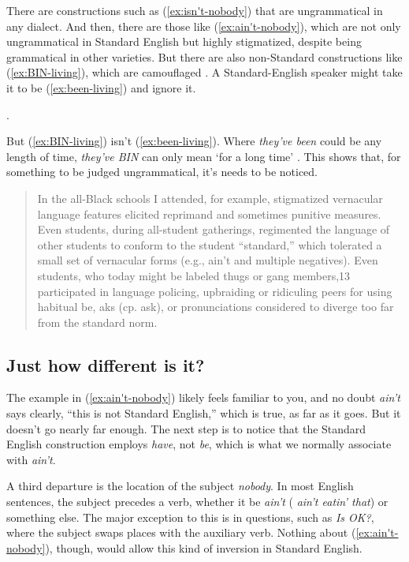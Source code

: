 There are constructions such as (\ref{ex:isn't-nobody}) that are ungrammatical in any dialect. And then, there are those like (\ref{ex:ain't-nobody}), which are not only ungrammatical in Standard English but highly stigmatized, despite being grammatical in other varieties.  But there are also non-Standard constructions like (\ref{ex:BIN-living}), which are camouflaged \citep{Spears2015}. A Standard-English speaker might take it to be (\ref{ex:been-living}) and ignore it.

. 

\ea
     \label{ex:BIN-living}
     \label{ex:been-living}
    \z
\z

But (\ref{ex:BIN-living}) isn't (\ref{ex:been-living}). Where \textit{they've been} could be any length of time, \textit{they've BIN} can only mean `for a long time' \citep{Spears2015}. This shows that, for something to be judged ungrammatical, it's needs to be noticed.

\begin{quote}
    In the all-Black schools I attended, for example, stigmatized vernacular language
features elicited reprimand and sometimes punitive measures. Even students, during all-student gatherings, regimented the language of other students to conform to the student “standard,” which tolerated a small set of vernacular forms (e.g., ain’t and multiple negatives). Even students, who today might be labeled thugs or gang members,13 participated in language policing, upbraiding or ridiculing peers for using habitual be, aks (cp. ask), or pronunciations considered to diverge too far from the standard norm. \cite[796]{Spears2015}
\end{quote}

\subsection{Just how different is it?}

The example in (\ref{ex:ain't-nobody}) likely feels familiar to you, and no doubt \textit{ain't} says clearly, ``this is not Standard English,'' which is true, as far as it goes. But it doesn't go nearly far enough. The next step is to notice that the Standard English construction employs \textit{have}, not \textit{be}, which is what we normally associate with \textit{ain't}.

A third departure is the location of the subject \textit{nobody}. In most English sentences, the subject precedes a verb, whether it be \textit{ain't} (\textit{ ain't eatin' that}) or something else. The major exception to this is in questions, such as \textit{Is  OK?}, where the subject swaps places with the auxiliary verb. Nothing about (\ref{ex:ain't-nobody}), though, would allow this kind of inversion in Standard English. 

